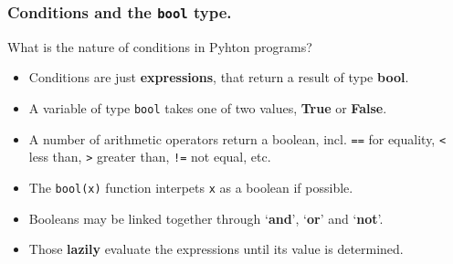 \documentclass{beamer} %
\newcommand\emc[1]{\textcolor{brightblue}{\textbf{#1}}}
\begin{document}
\begin{frame}

\frametitle{Conditions and the \texttt{bool} type.} 

What is the nature of conditions in Pyhton programs?
\begin{itemize}
\item Conditions are just \emc{expressions}, that return a result of type \emc{bool}.
\item A variable of type \texttt{bool} takes one of two values, \emc{True} or \emc{False}.
\item A number of arithmetic operators return a boolean, incl. \texttt{==} for equality, \texttt{<} less than, \texttt{>} greater than, \texttt{!=} not equal, etc.
\item The \texttt{bool(x)} function interpets \texttt{x} as a boolean if possible.
\item Booleans may be linked together through `\emc{and}', `\emc{or}' and `\emc{not}'.
\item Those \emc{lazily} evaluate the expressions until its value is determined.
\end{itemize}

\end{frame}


\end{document}
